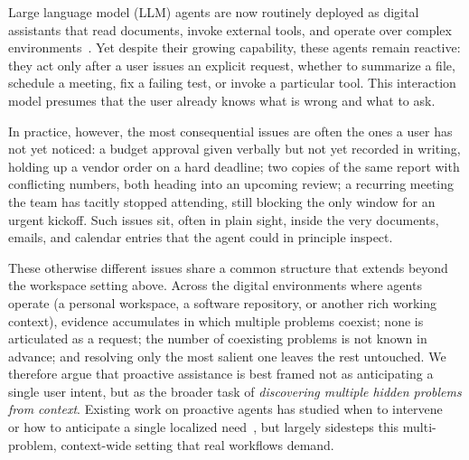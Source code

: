 \documentclass{llmxive}
\begin{document}
Large language model (LLM) agents are now routinely deployed as digital assistants that read documents, invoke external tools, and operate over complex environments~\cite{ReAct, SWE-agent, wu2024autogen}. Yet despite their growing capability, these agents remain reactive: they act only after a user issues an explicit request, whether to summarize a file, schedule a meeting, fix a failing test, or invoke a particular tool. This interaction model presumes that the user already knows what is wrong and what to ask.

In practice, however, the most consequential issues are often the ones a user has not yet noticed: a budget approval given verbally but not yet recorded in writing, holding up a vendor order on a hard deadline; two copies of the same report with conflicting numbers, both heading into an upcoming review; a recurring meeting the team has tacitly stopped attending, still blocking the only window for an urgent kickoff. Such issues sit, often in plain sight, inside the very documents, emails, and calendar entries that the agent could in principle inspect.

These otherwise different issues share a common structure that extends beyond the workspace setting above. Across the digital environments where agents operate (a personal workspace, a software repository, or another rich working context), evidence accumulates in which multiple problems coexist; none is articulated as a request; the number of coexisting problems is not known in advance; and resolving only the most salient one leaves the rest untouched. We therefore argue that proactive assistance is best framed not as anticipating a single user intent, but as the broader task of \textit{discovering multiple hidden problems from context}. Existing work on proactive agents has studied when to intervene~\cite{DBLP:conf/chi/LiuFSWIC25, DBLP:conf/emnlp/ZhangDLMKDCM25} or how to anticipate a single localized need~\cite{ProactiveAgent, ContextAgent, probe}, but largely sidesteps this multi-problem, context-wide setting that real workflows demand.
\end{document}
